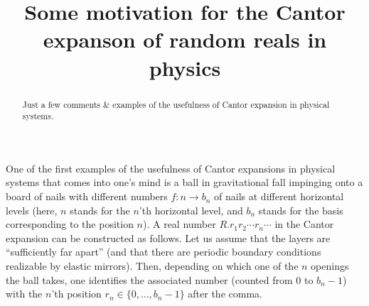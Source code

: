 \renewcommand{\baselinestretch}{1.3}






\title{Some motivation for the Cantor expanson of random reals in
physics}
\author{}
\date{ }
\maketitle

\begin{abstract}
Just a few comments \& examples
of the usefulness of Cantor expansion in physical systems.
\end{abstract}



One of the first examples of the usefulness
of Cantor expansions in physical systems
that comes into one's mind
is a ball in gravitational fall
impinging onto a  board of nails with different numbers
$f: n \rightarrow  b_n$ of nails
at different horizontal levels
(here, $n$ stands for the $n$'th horizontal level,
and $b_n$ stands for the basis corresponding to the position $n$).
A real number $R.r_1r_2\cdots r_n \cdots $ in the Cantor expansion
can be constructed as follows.
Let us assume that the layers are ``sufficiently far apart''
(and that there are periodic boundary conditions realizable by
elastic mirrors).
Then, depending on which one of the $n$ openings the ball takes,
one identifies the associated number
(counted from $0$ to $b_n-1$) with
the $n$'th position  $r_n \in \{0,\ldots ,b_n-1\}$ after the comma.


